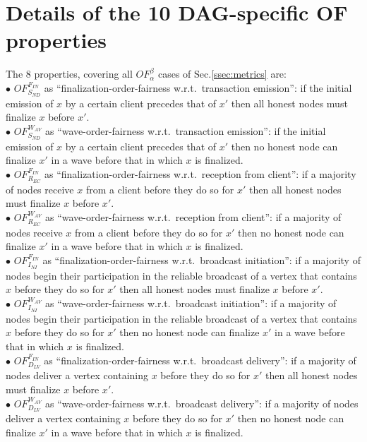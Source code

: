 
\section{Details of the 10 DAG-specific OF properties\label{anx:enumeration_order_fairness_props}}

The 8 properties, covering all $OF^\beta_\alpha$ cases of Sec.\ref{ssec:metrics} are:\\
\noindent$\bullet$ $OF^{F_{IN}}_{S_{ND}}$ as ``finalization-order-fairness w.r.t.~transaction emission'': if the initial emission of $x$ by a certain client precedes that of $x'$ then all honest nodes must finalize $x$ before $x'$.\\
\noindent$\bullet$ $OF^{W_{AV}}_{S_{ND}}$ as ``wave-order-fairness w.r.t.~transaction emission'': if the initial emission of $x$ by a certain client precedes that of $x'$ then no honest node can finalize $x'$ in a wave before that in which $x$ is finalized.\\
\noindent$\bullet$ $OF^{F_{IN}}_{R_{EC}}$ as ``finalization-order-fairness w.r.t.~reception from client'': if a majority of nodes receive $x$ from a client before they do so for $x'$ then all honest nodes must finalize $x$ before $x'$.\\
\noindent$\bullet$ $OF^{W_{AV}}_{R_{EC}}$ as ``wave-order-fairness w.r.t.~reception from client'': if a majority of nodes receive $x$ from a client before they do so for $x'$ then no honest node can finalize $x'$ in a wave before that in which $x$ is finalized.\\
\noindent$\bullet$ $OF^{F_{IN}}_{I_{NI}}$ as ``finalization-order-fairness w.r.t.~broadcast initiation'': if a majority of nodes begin their participation in the reliable broadcast of a vertex that contains $x$ before they do so for $x'$ then all honest nodes must finalize $x$ before $x'$.\\
\noindent$\bullet$ $OF^{W_{AV}}_{I_{NI}}$ as ``wave-order-fairness w.r.t.~broadcast initiation'': if a majority of nodes begin their participation in the reliable broadcast of a vertex that contains $x$ before they do so for $x'$ then no honest node can finalize $x'$ in a wave before that in which $x$ is finalized.\\
\noindent$\bullet$ $OF^{F_{IN}}_{D_{LV}}$ as ``finalization-order-fairness w.r.t.~broadcast delivery'': if a majority of nodes deliver a vertex containing $x$ before they do so for $x'$ then all honest nodes must finalize $x$ before $x'$.\\
\noindent$\bullet$ $OF^{W_{AV}}_{D_{LV}}$ as ``wave-order-fairness w.r.t.~broadcast delivery'': if a majority of nodes deliver a vertex containing $x$ before they do so for $x'$ then no honest node can finalize $x'$ in a wave before that in which $x$ is finalized.
